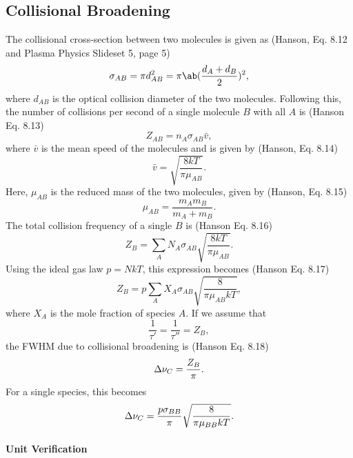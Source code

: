 \documentclass[11pt, twoside, fleqn]{report}
\begin{document}
\subsection{Collisional Broadening}

The collisional cross-section between two molecules is given as (Hanson, Eq. 8.12 and Plasma Physics Slideset 5, page 5)
\begin{equation*}
    \sigma_{AB} = \pi d_{AB}^{2} = \pi\ab(\frac{d_{A} + d_{B}}{2})^{2},
\end{equation*}
where $d_{AB}$ is the optical collision diameter of the two molecules. Following this, the number of collisions per second of a single molecule $B$ with all $A$ is (Hanson Eq. 8.13)
\begin{equation*}
    Z_{AB} = n_{A}\sigma_{AB}\bar{v},
\end{equation*}
where $\bar{v}$ is the mean speed of the molecules and is given by (Hanson, Eq. 8.14)
\begin{equation*}
    \bar{v} = \sqrt{\frac{8kT}{\pi\mu_{AB}}}.
\end{equation*}
Here, $\mu_{AB}$ is the reduced mass of the two molecules, given by (Hanson, Eq. 8.15)
\begin{equation*}
    \mu_{AB} = \frac{m_{A}m_{B}}{m_{A} + m_{B}}.
\end{equation*}
The total collision frequency of a single $B$ is (Hanson Eq. 8.16)
\begin{equation*}
    Z_{B} = \sum_{A}N_{A}\sigma_{AB}\sqrt{\frac{8kT}{\pi\mu_{AB}}}.
\end{equation*}
Using the ideal gas law $p = NkT$, this expression becomes (Hanson Eq. 8.17)
\begin{equation*}
    Z_{B} = p\sum_{A}X_{A}\sigma_{AB}\sqrt{\frac{8}{\pi\mu_{AB}kT}},
\end{equation*}
where $X_{A}$ is the mole fraction of species $A$. If we assume that
\begin{equation*}
    \frac{1}{\tau'} = \frac{1}{\tau''} = Z_{B},
\end{equation*}
the FWHM due to collisional broadening is (Hanson Eq. 8.18)
\begin{equation*}
    \adif{\nu}_{C} = \frac{Z_{B}}{\pi}.
\end{equation*}
For a single species, this becomes
\begin{equation*}
    \adif{\nu}_{C} = \frac{p\sigma_{BB}}{\pi}\sqrt{\frac{8}{\pi\mu_{BB}kT}}.
\end{equation*}

\paragraph{Unit Verification}
\end{document}
